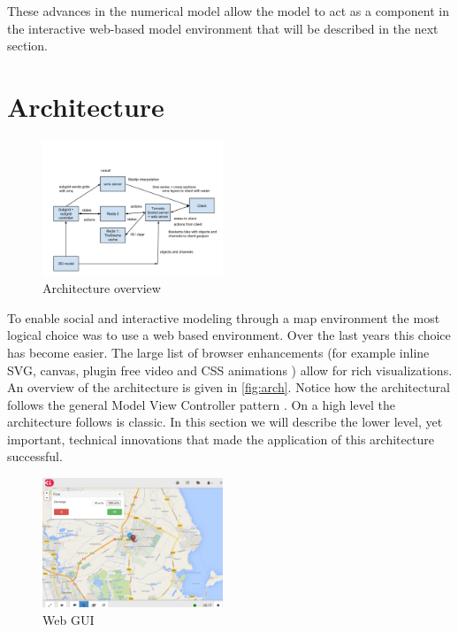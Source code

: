 \documentclass[a4paper]{article}
\begin{document}
These advances in the numerical model allow the model to act as a component in the interactive web-based model environment that will be described in the next section.

\section{Architecture}
\begin{figure}
  \centering
  \includegraphics[width=0.48\textwidth]{architecture}
  \caption{Architecture overview}
  \label{fig:arch}
\end{figure}

To enable social and interactive modeling through a map environment the most logical choice was to use a web based environment. Over the last years this choice has become easier. The large list of browser enhancements (for example inline \ac{SVG}, canvas, plugin free video \citep{Berjon2014} and \ac{CSS} animations \citep{Jackson2013}) allow for rich visualizations. An overview of the architecture is given in \autoref{fig:arch}. Notice how the architectural follows the general Model View Controller pattern \citep{Gamma1994}. On a high level the architecture follows is classic. In this section we will describe the lower level, yet important,  technical innovations that made the application of this architecture successful.

\begin{figure}
  \centering
  \includegraphics[width=0.48\textwidth]{webgui}
  \caption{Web \ac{GUI}}
  \label{fig:gui}
\end{figure}
\end{document}
